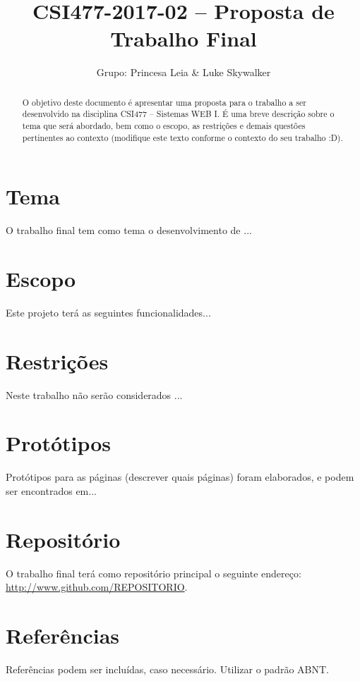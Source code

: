 \documentclass[10pt,a4paper,article]{abntex2}
\title{CSI477-2017-02 -- Proposta de Trabalho Final}
\author{Grupo: Princesa Leia \& Luke Skywalker}
\begin{document}
	\maketitle

	\begin{abstract}
		O objetivo deste documento é apresentar uma proposta para o trabalho a ser desenvolvido na disciplina CSI477 -- Sistemas WEB I. É uma breve descrição sobre o tema que será abordado, bem como o escopo, as restrições e demais questões pertinentes ao contexto (modifique este texto conforme o contexto do seu trabalho :D).
	\end{abstract}

	\section{Tema}

		O trabalho final tem como tema o desenvolvimento de ...

	\section{Escopo}

		Este projeto terá as seguintes funcionalidades...

	\section{Restrições}

		Neste trabalho não serão considerados ...

	\section{Protótipos}
		  Protótipos para as páginas (descrever quais páginas) foram elaborados, e podem ser encontrados em...

	\section{Repositório}

		O trabalho final terá como repositório principal o seguinte endereço: \url{http://www.github.com/REPOSITORIO}.

	\section{Referências}
	Referências podem ser incluídas, caso necessário. Utilizar o padrão ABNT.
\end{document}
